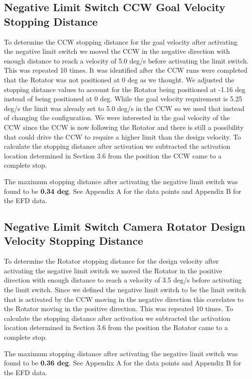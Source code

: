 \documentclass[SE,lsstdraft,authoryear,toc]{lsstdoc}
\begin{document}
\subsection{Negative Limit Switch CCW Goal Velocity Stopping Distance}

To determine the CCW stopping distance for the goal velocity after
activating the negative limit switch we moved the CCW in the negative
direction with enough distance to reach a velocity of 5.0 deg/s before
activating the limit switch. This was repeated 10 times. It was
identified after the CCW runs were completed that the Rotator was not
positioned at 0 deg as we thought. We adjusted the stopping distance
values to account for the Rotator being positioned at -1.16 deg instead
of being positioned at 0 deg. While the goal velocity requirement is
5.25 deg/s the limit was already set to 5.0 deg/s in the CCW so we used
that instead of changing the configuration. We were interested in the
goal velocity of the CCW since the CCW is now following the Rotator and
there is still a possibility that could drive the CCW to require a
higher limit than the design velocity. To calculate the stopping
distance after activation we subtracted the activation location
determined in Section 3.6 from the position the CCW came to a complete
stop.

The maximum stopping distance after activating the negative limit switch
was found to be \textbf{0.34 deg}. See Appendix A for the data points
and Appendix B for the EFD data.

\subsection{Negative Limit Switch Camera Rotator Design Velocity Stopping Distance }

To determine the Rotator stopping distance for the design velocity after
activating the negative limit switch we moved the Rotator in the
positive direction with enough distance to reach a velocity of 3.5 deg/s
before activating the limit switch. Since we defined the negative limit
switch to be the limit switch that is activated by the CCW moving in the
negative direction this correlates to the Rotator moving in the positive
direction. This was repeated 10 times. To calculate the stopping
distance after activation we subtracted the activation location
determined in Section 3.6 from the position the Rotator came to a
complete stop.

The maximum stopping distance after activating the negative limit switch
was found to be \textbf{0.36 deg}. See Appendix A for the data points
and Appendix B for the EFD data.
\end{document}
